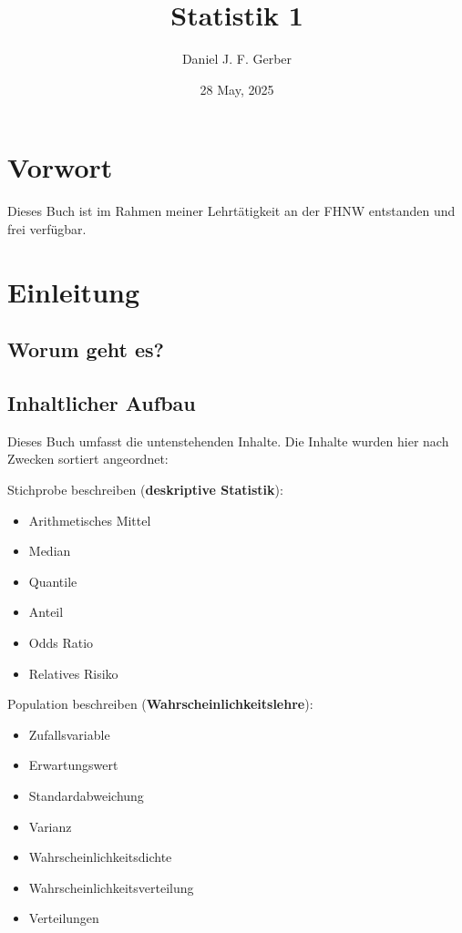 \documentclass[
]{book}
\title{Statistik 1}
\author{Daniel J. F. Gerber}
\date{28 May, 2025}
\providecommand{\tightlist}{%
  \setlength{\itemsep}{0pt}\setlength{\parskip}{0pt}}
\theoremstyle{definition}
\theoremstyle{definition}
\theoremstyle{definition}
\theoremstyle{definition}
\theoremstyle{remark}
\begin{document}
\maketitle

{
\setcounter{tocdepth}{1}
\tableofcontents
}
\chapter*{Vorwort}\label{vorwort}

Dieses Buch ist im Rahmen meiner Lehrtätigkeit an der FHNW entstanden und frei verfügbar.

\chapter{Einleitung}\label{einleitung}

\section{Worum geht es?}\label{worum-geht-es}

\section{Inhaltlicher Aufbau}\label{inhaltlicher-aufbau}

Dieses Buch umfasst die untenstehenden Inhalte. Die Inhalte wurden hier nach Zwecken sortiert angeordnet:

Stichprobe beschreiben (\textbf{deskriptive Statistik}):

\begin{itemize}
\tightlist
\item
  Arithmetisches Mittel
\item
  Median
\item
  Quantile
\item
  Anteil
\item
  Odds Ratio
\item
  Relatives Risiko
\end{itemize}

Population beschreiben (\textbf{Wahrscheinlichkeitslehre}):

\begin{itemize}
\tightlist
\item
  Zufallsvariable
\item
  Erwartungswert
\item
  Standardabweichung
\item
  Varianz
\item
  Wahrscheinlichkeitsdichte
\item
  Wahrscheinlichkeitsverteilung
\item
  Verteilungen
\end{itemize}
\end{document}
